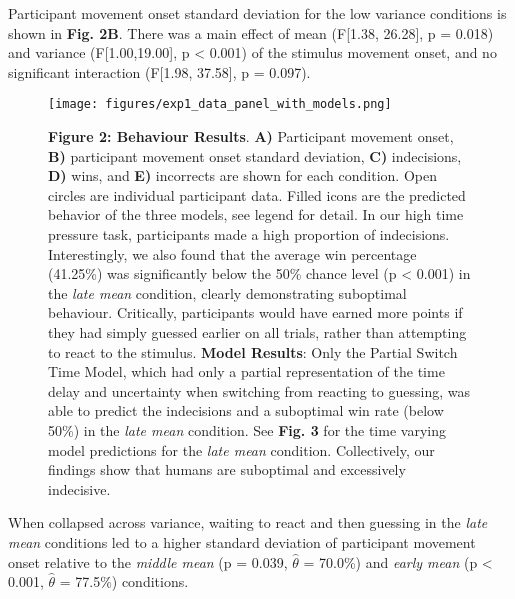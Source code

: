 \documentclass[12pt]{article}
\newcommand\boldblue[1]{\textcolor{mydarkblue}{\textbf{#1}}}
\begin{document}
Participant movement onset standard deviation for the low variance conditions is shown in \boldblue{Fig. 2B}. There was a main effect of mean (F[1.38, 26.28], p = 0.018) and variance (F[1.00,19.00], p < 0.001) of the stimulus movement onset, and no significant interaction (F[1.98, 37.58], p = 0.097). 

\begin{figure}[H]
  \begin{minipage}[c][\pdfpageheight][t]{0.5\textwidth}

      \texttt{[image: figures/exp1\_data\_panel\_with\_models.png]}
  \end{minipage}\hfill
  \begin{minipage}[c][\pdfpageheight][t]{0.5\textwidth}
      \caption*{
        \boldblue{Figure 2: Behaviour Results}. \boldblue{A)} Participant movement onset, \boldblue{B)} participant movement onset standard deviation, \boldblue{C)} indecisions, \boldblue{D)} wins, and \boldblue{E)} incorrects are shown for each condition. Open circles are individual participant data. Filled icons are the predicted behavior of the three models, see legend for detail. In our high time pressure task, participants made a high proportion of indecisions. Interestingly, we also found that the average win percentage (41.25\%) was significantly below the 50\% chance level (p < 0.001) in the \emph{late mean} condition, clearly demonstrating suboptimal behaviour. Critically, participants would have earned more points if they had simply guessed earlier on all trials, rather than attempting to react to the stimulus. \boldblue{Model Results}: Only the Partial Switch Time Model, which had only a partial representation of the time delay and uncertainty when switching from reacting to guessing, was able to predict the indecisions and a suboptimal win rate (below 50\%) in the \emph{late mean} condition. See \boldblue{Fig. 3} for the time varying model predictions for the \emph{late mean} condition. Collectively, our findings show that humans are suboptimal and excessively indecisive.} 
  \end{minipage}
\end{figure}

\noindent When collapsed across variance, waiting to react and then guessing in the \emph{late mean} conditions led to a higher standard deviation of participant movement onset relative to the \emph{middle mean} (p = 0.039, $\hat{\theta}$ = 70.0\%) and \emph{early mean} (p < 0.001, $\hat{\theta}$ = 77.5\%) conditions.
\end{document}
